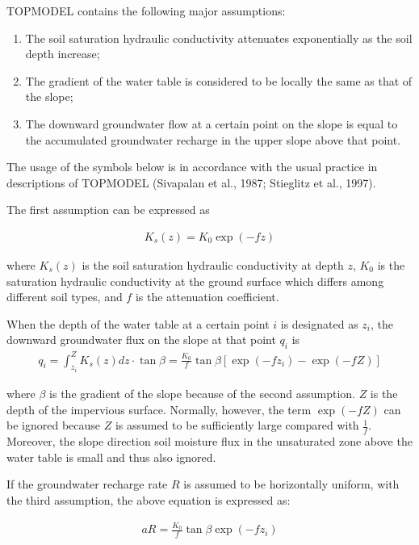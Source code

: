 TOPMODEL contains the following major assumptions:

\begin{enumerate}
\def\labelenumi{\arabic{enumi}.}
\tightlist
\item
  The soil saturation hydraulic conductivity attenuates exponentially as the soil depth increase;
\item
  The gradient of the water table is considered to be locally the same as that of the slope;
\item
  The downward groundwater flow at a certain point on the slope is equal to the accumulated groundwater recharge in the upper slope above that point.
\end{enumerate}

The usage of the symbols below is in accordance with the usual practice in descriptions of TOPMODEL (Sivapalan et al., 1987; Stieglitz et al., 1997).

The first assumption can be expressed as

\begin{eqnarray}
K_s(z) = K_0 \exp (-f z)
\label{eq261}
\end{eqnarray}

where \(K_s(z)\) is the soil saturation hydraulic conductivity at depth \(z\), \(K_0\) is the saturation hydraulic conductivity at the ground surface which differs among different soil types, and
\(f\) is the attenuation coefficient.

When the depth of the water table at a certain point \(i\) is designated as \(z_i\), the downward groundwater flux on the slope at that point \(q_i\) is \begin{eqnarray}
q_i = \int_{z_i}^Z K_s(z) dz \cdot \tan\beta
   = \frac{K_0}{f}  \tan\beta [\exp(-f z_i) - \exp(-f Z)] \label{eq262}
\end{eqnarray}

where \(\beta\) is the gradient of the slope because of the second assumption. \(Z\) is the depth of the impervious surface. Normally, however, the term \(\exp(-f Z)\) can be ignored because \(Z\) is
assumed to be sufficiently large compared with \(\frac1f\). Moreover, the slope direction soil moisture flux in the unsaturated zone above the water table is small and thus also ignored.

If the groundwater recharge rate \(R\) is assumed to be horizontally uniform, with the third assumption, the above equation is expressed as:

\begin{eqnarray}
a R = \frac{K_0}{f} \tan\beta \exp(-f z_i)
\label{eq263}
\end{eqnarray}

